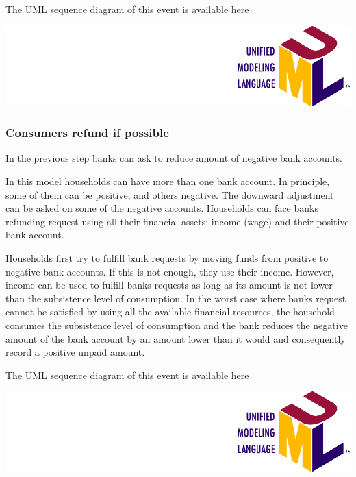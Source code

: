 \documentclass{book}
\newcommand{\doclocation}{file:///Users/giulioni/Documents/workspace/gabriele/docs}
\begin{document}
\vskip2mm

The UML sequence diagram of this event is available \href{\doclocation/umldoc/updateConsumersAccounts.html}{here}
\begin{marginfigure}
	\includegraphics[scale=0.1]{uml.png}
\end{marginfigure}


\subsubsection{Consumers refund if possible}

In the previous step banks can ask to reduce amount of negative bank accounts. 

In this model households can have more than one bank account. In principle, some of them can be positive, and others negative. The downward adjustment can be asked on some of the negative accounts.  Households can face banks refunding request using all their financial assets: income (wage) and their positive bank account. 

Households first try to fulfill bank requests by moving funds from positive to negative bank accounts. If this is not enough, they use their income. However, income can be used to fulfill banks requests as long as its amount is not lower than the subsistence level of consumption. In the worst case where banks request cannot be satisfied by using all the available financial resources, the household consumes the subsistence level of consumption and the bank reduces the negative amount of the bank account by an amount lower than it would and consequently record a positive unpaid amount.     

The UML sequence diagram of this event is available \href{\doclocation/umldoc/payBackBankDebt.html}{here}
\begin{marginfigure}
	\includegraphics[scale=0.1]{uml.png}
\end{marginfigure}
\end{document}
